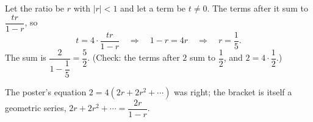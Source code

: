 Let the ratio be $r$ with $|r|<1$ and let a term be $t\ne0$. The terms after it sum to $\dfrac{tr}{1-r}$, so
\[
t=4\cdot\dfrac{tr}{1-r}\quad\Longrightarrow\quad1-r=4r\quad\Longrightarrow\quad r=\dfrac{1}{5} .
\]
The sum is $\dfrac{2}{1-\dfrac{1}{5}}=\boxed{\dfrac{5}{2}}$. (Check: the terms after $2$ sum to $\dfrac{1}{2}$, and $2=4\cdot\dfrac{1}{2}$.)

The poster's equation $2=4(2r+2r^2+\cdots)$ was right; the bracket is itself a geometric series, $2r+2r^2+\cdots=\dfrac{2r}{1-r}$.
